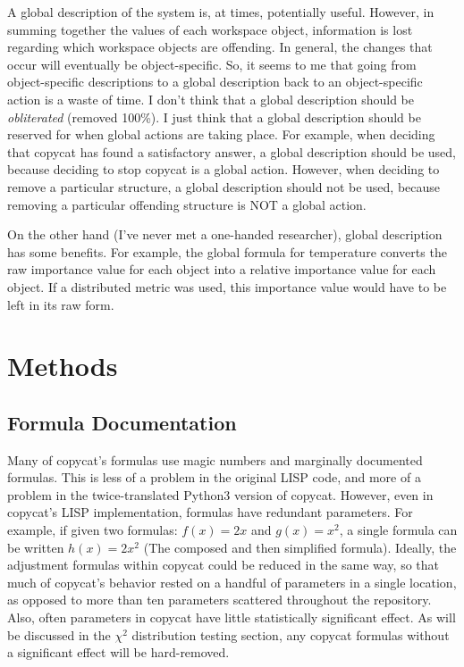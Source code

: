 \documentclass[a4paper]{article}
\begin{document}
    A global description of the system is, at times, potentially useful.
    However, in summing together the values of each workspace object, information is lost regarding which workspace objects are offending.
    In general, the changes that occur will eventually be object-specific.
    So, it seems to me that going from object-specific descriptions to a global description back to an object-specific action is a waste of time.
    I don't think that a global description should be \emph{obliterated} (removed 100\%).
    I just think that a global description should be reserved for when global actions are taking place.
    For example, when deciding that copycat has found a satisfactory answer, a global description should be used, because deciding to stop copycat is a global action.
    However, when deciding to remove a particular structure, a global description should not be used, because removing a particular offending structure is NOT a global action.

    On the other hand (I've never met a one-handed researcher), global description has some benefits.
    For example, the global formula for temperature converts the raw importance value for each object into a relative importance value for each object.
    If a distributed metric was used, this importance value would have to be left in its raw form.


\section{Methods}

    \subsection{Formula Documentation}

        Many of copycat's formulas use magic numbers and marginally documented formulas.
        This is less of a problem in the original LISP code, and more of a problem in the twice-translated Python3 version of copycat.
        However, even in copycat's LISP implementation, formulas have redundant parameters.
        For example, if given two formulas: $f(x) = 2x$ and $g(x) = x^2$, a single formula can be written $h(x) = 2x^2$ (The composed and then simplified formula).
        Ideally, the adjustment formulas within copycat could be reduced in the same way, so that much of copycat's behavior rested on a handful of parameters in a single location, as opposed to more than ten parameters scattered throughout the repository.
        Also, often parameters in copycat have little statistically significant effect.
        As will be discussed in the $\chi^2$ distribution testing section, any copycat formulas without a significant effect will be hard-removed.
\end{document}
